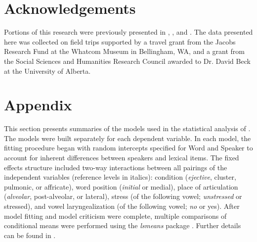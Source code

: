 \documentclass[output=paper,colorlinks,citecolor=brown]{langscibook}
\begin{document}
\section*{Acknowledgements}
Portions of this research were previously presented in \citet{Puderbaugh2015}, \citet{Puderbaugh2019a}, and \citet{Puderbaugh2019}. The data presented here was collected on field trips supported by a travel grant from the Jacobs Research Fund at the Whatcom Museum in Bellingham, WA, and a grant from the Social Sciences and Humanities Research Council awarded to Dr. David Beck at the University of Alberta.

\section*{Appendix}\label{section:Appendix}
This section presents summaries of the models used in the statistical analysis of . The models were built separately for each dependent variable. In each model, the fitting procedure began with random intercepts specified for Word and Speaker to account for inherent differences between speakers and lexical items. The fixed effects structure included two-way interactions between all pairings of the independent variables (reference levels in italics): condition (\emph{ejective}, cluster, pulmonic, or affricate), word position (\emph{initial} or medial), place of articulation (\emph{alveolar}, post-alveolar, or lateral), stress (of the following vowel; \emph{unstressed} or stressed), and vowel laryngealization (of the following vowel; \emph{no} or yes). After model fitting and model criticism were complete, multiple comparisons of conditional means were performed using the \textit{lsmeans} package \citep{Lenth2016}. Further details can be found in \citet{Puderbaugh2019a}.
\end{document}
